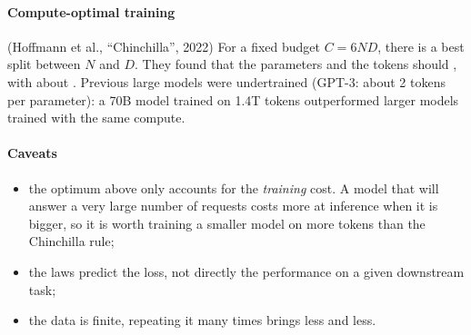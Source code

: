\paragraph{Compute-optimal training} (Hoffmann et al., ``Chinchilla'', 2022) For a fixed
budget $C=6ND$, there is a best split between $N$ and $D$. They found that the parameters and
the tokens should , with about . Previous large
models were undertrained (GPT-3: about 2 tokens per parameter): a 70B model trained on 1.4T
tokens outperformed larger models trained with the same compute.

\paragraph{Caveats}
\begin{itemize}
    \item the optimum above only accounts for the \emph{training} cost. A model that will
        answer a very large number of requests costs more at inference when it is bigger, so
        it is worth training a smaller model on more tokens than the Chinchilla rule;
    \item the laws predict the loss, not directly the performance on a given downstream task;
    \item the data is finite, repeating it many times brings less and less.
\end{itemize}
